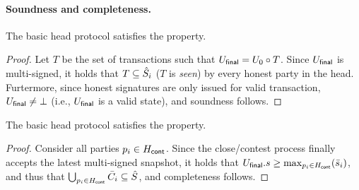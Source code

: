 \paragraph{Soundness and completeness.}

\begin{lemma}[Soundness]
  \label{lem:soundness}
  The basic head protocol satisfies the  property.
\end{lemma}

\begin{proof}
  Let $T$ be the set of transactions such that $U_{\mathsf{final}}=U_0\circ T$.
  Since $U_{\mathsf{final}}$ is multi-signed, it holds that $T\subseteq\hat{S}_i$
  ($T$ is \emph{seen}) by every honest party in the head.
  Furtermore, since honest signatures are only issued for valid transaction,
  $U_{\mathsf{final}}\not=\bot$ (i.e., $U_{\mathsf{final}}$ is a valid state), and soundness
  follows.
\end{proof}


\begin{lemma}[Completeness]
 \label{lem:completeness}
 The basic head protocol satisfies the 
 property.
\end{lemma}
\begin{proof}
  Consider all parties $p_i\in H_{\mathsf{cont}}$. Since the close/contest process
  finally accepts the latest multi-signed snapshot, it holds that
  $U_{\mathsf{final}}.s \geq \max_{p_i\in H_{\mathsf{cont}}}(\bar s_i)$, and thus that
  $\bigcup_{p_i\in H_{\mathsf{cont}}}\bar{C}_i\subseteq\hat{S}$,
  and completeness follows.
\end{proof}

